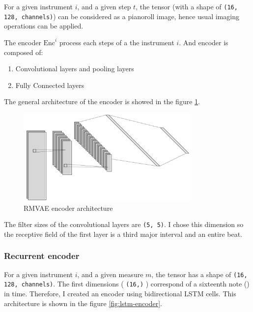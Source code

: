 \documentclass[12pt]{report}
\begin{document}
For a given instrument $i$, and a given step $t$, the tensor (with a shape of \texttt{(16, 128, channels)}) can be considered as a pianoroll image, hence usual imaging operations can be applied.

The encoder $\text{Enc}^i$ process each steps of a the instrument $i$. And encoder is composed of:
\begin{enumerate}
    \item Convolutional layers and pooling layers
    \item Fully Connected layers
\end{enumerate}
The general architecture of the encoder is showed in the figure \ref{fig:rmvae_encoder}.

\begin{figure}[h]
    \centering
    \includegraphics[width=0.8\textwidth]{images/nn/architectures/rmvae/encoder.jpg}
    \caption{RMVAE encoder architecture}
    \label{fig:rmvae_encoder}
\end{figure}

The filter sizes of the convolutional layers are \texttt{(5, 5)}.
I chose this dimension so the receptive field of the first layer is a third major interval and an entire beat.

\subsubsection{Recurrent encoder}
\label{sec:encoder:rnn}

For a given instrument $i$, and a given measure $m$, the tensor has a shape of \texttt{(16, 128, channels)}.
The first dimensions ( \texttt{(16,)} ) correspond of a sixteenth note (\musSixteenth) in time.
Therefore, I created an encoder using bidirectional LSTM cells.
This architecture is shown in the figure \ref{fig:lstm-encoder}.
\end{document}
